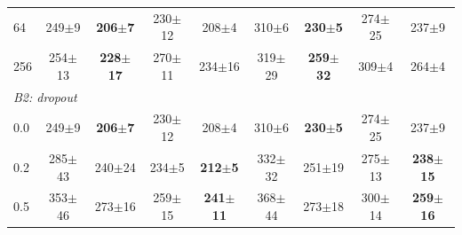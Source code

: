 \begin{table}[t]
\begin{tabular}{@{}lcccccccc@{}}
\hspace{4pt}64 & 249$\pm$9 & \textbf{206$\pm$7} & 230$\pm$12 & 208$\pm$4 & 310$\pm$6 & \textbf{230$\pm$5} & 274$\pm$25 & 237$\pm$9 \\
\hspace{4pt}256 & 254$\pm$13 & \textbf{228$\pm$17} & 270$\pm$11 & 234$\pm$16 & 319$\pm$29 & \textbf{259$\pm$32} & 309$\pm$4 & 264$\pm$4 \\
\midrule
\multicolumn{9}{l}{\textit{B2: dropout}} \\
\hspace{4pt}0.0 & 249$\pm$9 & \textbf{206$\pm$7} & 230$\pm$12 & 208$\pm$4 & 310$\pm$6 & \textbf{230$\pm$5} & 274$\pm$25 & 237$\pm$9 \\
\hspace{4pt}0.2 & 285$\pm$43 & 240$\pm$24 & 234$\pm$5 & \textbf{212$\pm$5} & 332$\pm$32 & 251$\pm$19 & 275$\pm$13 & \textbf{238$\pm$15} \\
\hspace{4pt}0.5 & 353$\pm$46 & 273$\pm$16 & 259$\pm$15 & \textbf{241$\pm$11} & 368$\pm$44 & 273$\pm$18 & 300$\pm$14 & \textbf{259$\pm$16} \\
\bottomrule
\end{tabular}
\end{table}